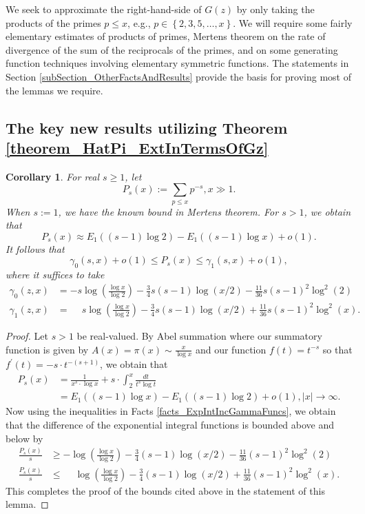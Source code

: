 \documentclass[11pt,reqno,a4letter]{article}
\numberwithin{figure}{section}
\numberwithin{table}{section}
\theoremstyle{plain}
\newtheorem{cor}[theorem]{Corollary}
\numberwithin{theorem}{section}
\theoremstyle{definition}
\begin{document}
We seek to approximate the right-hand-side of $G(z)$ by only taking the products of the primes 
$p \leq x$, e.g., $p \in \left\{2,3,5,\ldots,x\right\}$. 
We will require some fairly elementary estimates of products of primes, Mertens theorem on the 
rate of divergence of the sum of the reciprocals of the primes, and on some generating function 
techniques involving elementary symmetric functions. 
The statements in Section \ref{subSection_OtherFactsAndResults} provide the basis for proving 
most of the lemmas we require. 

\subsection{The key new results utilizing Theorem \ref{theorem_HatPi_ExtInTermsOfGz}} 

\begin{cor} 
\label{cor_PartialSumsOfReciprocalsOfPrimePowers} 
For real $s \geq 1$, let 
\[
P_s(x) := \sum_{p \leq x} p^{-s}, x \gg 1. 
\]
When $s := 1$, we have the known bound in Mertens theorem. For $s > 1$, we obtain that 
\[
P_s(x) \approx E_1((s-1) \log 2) - E_1((s-1) \log x) + o(1). 
\]
It follows that 
\[
\gamma_0(s, x) + o(1) \leq P_s(x) \leq \gamma_1(s, x) + o(1), 
\]
where it suffices to take 
\begin{align*}
\gamma_0(z, x) & = -s\log\left(\frac{\log x}{\log 2}\right) - \frac{3}{4}s(s-1) \log(x/2) - 
     \frac{11}{36} s(s-1)^2 \log^2(2) \\ 
\gamma_1(z, x) & = \phantom{-} s\log\left(\frac{\log x}{\log 2}\right) - \frac{3}{4}s(s-1) \log(x/2) + 
     \frac{11}{36} s(s-1)^2 \log^2(x). 
\end{align*}
\end{cor} 
\begin{proof} 
Let $s > 1$ be real-valued. 
By Abel summation where our summatory function is given by $A(x) = \pi(x) \sim \frac{x}{\log x}$ and 
our function $f(t) = t^{-s}$ so that $f^{\prime}(t) = -s \cdot t^{-(s+1)}$, we obtain that 
\begin{align*} 
P_s(x) & = \frac{1}{x^s \cdot \log x} + s \cdot \int_2^{x} \frac{dt}{t^s \log t} \\ 
     & = E_1((s-1) \log x) - E_1((s-1) \log 2) + o(1), |x| \rightarrow \infty. 
\end{align*} 
Now using the inequalities in Facts \ref{facts_ExpIntIncGammaFuncs}, we obtain that the 
difference of the exponential integral functions is bounded above and below by 
\begin{align*} 
\frac{P_s(x)}{s} & \geq -\log\left(\frac{\log x}{\log 2}\right) - \frac{3}{4}(s-1) \log(x/2) - 
     \frac{11}{36} (s-1)^2 \log^2(2) \\ 
\frac{P_s(x)}{s} & \leq \phantom{-} \log\left(\frac{\log x}{\log 2}\right) - \frac{3}{4}(s-1) \log(x/2) + 
     \frac{11}{36} (s-1)^2 \log^2(x). 
\end{align*} 
This completes the proof of the bounds cited above in the statement of this lemma. 
\end{proof} 
\end{document}
